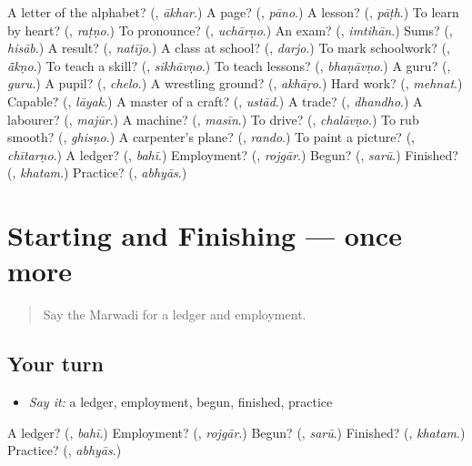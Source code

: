 \begin{tcolorbox}[breakable,colback=teal!4,colframe=teal!35!black,title={Before you move on}]
A letter of the alphabet? (\textbf{}, \emph{ākhar}.) A page? (\textbf{}, \emph{pāno}.) A lesson? (\textbf{}, \emph{pāṭh}.) To learn by heart? (\textbf{}, \emph{raṭṇo}.) To pronounce? (\textbf{}, \emph{uchārṇo}.) An exam? (\textbf{}, \emph{imtihān}.) Sums? (\textbf{}, \emph{hisāb}.) A result? (\textbf{}, \emph{natījo}.) A class at school? (\textbf{}, \emph{darjo}.) To mark schoolwork? (\textbf{}, \emph{ā̃kṇo}.) To teach a skill? (\textbf{}, \emph{sikhāvṇo}.) To teach lessons? (\textbf{}, \emph{bhaṇāvṇo}.) A guru? (\textbf{}, \emph{guru}.) A pupil? (\textbf{}, \emph{chelo}.) A wrestling ground? (\textbf{}, \emph{akhāṛo}.) Hard work? (\textbf{}, \emph{mehnat}.) Capable? (\textbf{}, \emph{lāyak}.) A master of a craft? (\textbf{}, \emph{ustād}.) A trade? (\textbf{}, \emph{dhandho}.) A labourer? (\textbf{}, \emph{majūr}.) A machine? (\textbf{}, \emph{masīn}.) To drive? (\textbf{}, \emph{chalāvṇo}.) To rub smooth? (\textbf{}, \emph{ghisṇo}.) A carpenter's plane? (\textbf{}, \emph{rando}.) To paint a picture? (\textbf{}, \emph{chītarṇo}.) A ledger? (\textbf{}, \emph{bahī}.) Employment? (\textbf{}, \emph{rojgār}.) Begun? (\textbf{}, \emph{sarū}.) Finished? (\textbf{}, \emph{khatam}.) Practice? (\textbf{}, \emph{abhyās}.)
\end{tcolorbox}
\section[(dialogue)]{Starting and Finishing — once more}

\label{lesson:MW-R290-review-final-290}



\begin{quote}
Say the Marwadi for a ledger and employment.
\end{quote}

\subsection*{Your turn}
\begin{itemize}
\raggedright
  \item \emph{Say it:} a ledger, employment, begun, finished, practice
\end{itemize}

\begin{tcolorbox}[breakable,colback=teal!4,colframe=teal!35!black,title={Before you move on}]
A ledger? (\textbf{}, \emph{bahī}.) Employment? (\textbf{}, \emph{rojgār}.) Begun? (\textbf{}, \emph{sarū}.) Finished? (\textbf{}, \emph{khatam}.) Practice? (\textbf{}, \emph{abhyās}.)
\end{tcolorbox}
